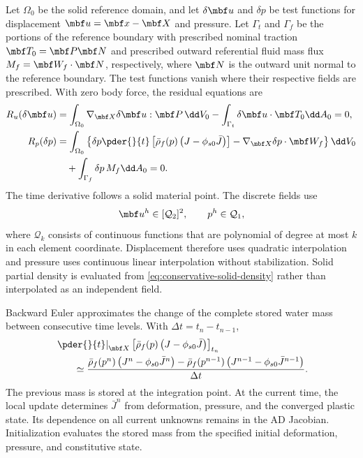 Let \(\Omega_0\) be the solid reference domain, and let \(\delta\mbf u\)
and \(\delta p\) be test functions for displacement
\(\mbf u=\mbf x-\mbf X\) and pressure.  Let
\(\Gamma_t\) and \(\Gamma_f\) be the portions of the reference boundary with
prescribed nominal traction
\(\mbf T_0=\mbf P\mbf N\) and prescribed outward referential fluid mass
flux \(M_f=\mbf W_f\mathbin{\cdot}\mbf N\), respectively, where
\(\mbf N\) is the outward unit normal to the reference boundary.
The test functions vanish where their respective fields are prescribed.
With zero body force, the residual equations are
\begin{align}
 R_u(\delta\mbf u)
 &=\int_{\Omega_0}\nabla_{\mbf X}\delta\mbf u:
 \mbf P\,\dd V_0
 -\int_{\Gamma_t}\delta\mbf u\mathbin{\cdot}\mbf T_0\dd A_0=0,
 \label{eq:momentum-weak-residual}\\
 R_p(\delta p)
 &=\int_{\Omega_0}\left\{\delta p\pder{}{t}
 \left[\bar\rho_f(p)\left(J-\phi_{s0}\bar J\right)\right]
 -\nabla_{\mbf X}\delta p\mathbin{\cdot}\mbf W_f\right\}\dd V_0 \notag\\
 &\quad+\int_{\Gamma_f}\delta p\,M_f\dd A_0=0.
 \label{eq:fluid-pressure-weak-residual}
\end{align}
The time derivative follows a solid material point.  The discrete fields use
\begin{equation}
 \mbf u^h\in[\mathcal Q_2]^2,\qquad p^h\in\mathcal Q_1,
 \label{eq:finite-element-spaces}
\end{equation}
where \(\mathcal Q_k\) consists of continuous functions that are polynomial
of degree at most \(k\) in each element coordinate.  Displacement therefore
uses quadratic interpolation and pressure uses continuous linear
interpolation without stabilization.  Solid partial density is evaluated
from \eqref{eq:conservative-solid-density} rather than interpolated as an
independent field.

Backward Euler approximates the change of the complete stored water mass
between consecutive time levels.  With \(\Delta t=t_n-t_{n-1}\),
\begin{align}
 &\left.\pder{}{t}\right|_{\mbf X}
 \left[\bar\rho_f(p)\left(J-\phi_{s0}\bar J\right)\right]_{t_n}
 \notag\\
 &\qquad\simeq
 \frac{\bar\rho_f(p^n)\left(J^n-\phi_{s0}\bar J^n\right)
 -\bar\rho_f(p^{n-1})\left(J^{n-1}-\phi_{s0}\bar J^{n-1}\right)}
 {\Delta t}.
 \label{eq:conservative-fluid-mass-step}
\end{align}
The previous mass is stored at the integration point.  At the current time,
the local update determines \(\bar J^n\) from deformation, pressure, and
the converged plastic state.  Its dependence on all current unknowns remains
in the AD Jacobian.  Initialization evaluates the stored mass from the
specified initial deformation, pressure, and constitutive state.

